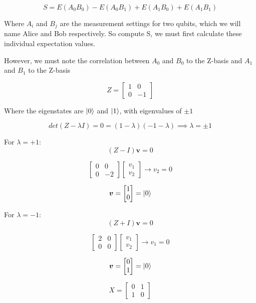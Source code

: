 \documentclass[12pt]{article}
\begin{document}
$$
S = E(A_0 B_0) - E(A_0 B_1) + E(A_1 B_0) + E(A_1 B_1)
$$

Where $A_i$ and $B_j$ are the measurement settings for two qubits, which we will name Alice and Bob respectively. So compute S, we must first calculate these individual expectation values.

However, we must note the correlation between $A_0$ and $B_0$ to the Z-basis and $A_1$ and $B_1$ to the Z-basis

$$
Z = \begin{bmatrix}
1 & 0 \\
0 & -1
\end{bmatrix}
$$

Where the eigenstates are $\ket{0}$ and $\ket{1}$, with eigenvalues of $\pm1$

$$
det(Z-\lambda I) = 0 = (1-\lambda)(-1-\lambda) \implies \lambda = \pm 1
$$

For $\lambda = +1$:
$$
(Z-I)\boldsymbol{v} = 0 
$$

$$
\begin{bmatrix}
0 & 0 \\
0 & -2
\end{bmatrix}
\begin{bmatrix}
v_1 \\
v_2
\end{bmatrix} \rightarrow v_2 = 0
$$

$$
\boldsymbol{v} = \begin{bmatrix}
1 \\
0
\end{bmatrix} = \ket{0}
$$

For $\lambda = -1$:
$$
(Z+I)\boldsymbol{v} = 0 
$$

$$
\begin{bmatrix}
2 & 0 \\
0 & 0
\end{bmatrix}
\begin{bmatrix}
v_1 \\
v_2
\end{bmatrix} \rightarrow v_1 = 0
$$

$$
\boldsymbol{v} = \begin{bmatrix}
0 \\
1
\end{bmatrix} = \ket{0}
$$



$$
X = \begin{bmatrix}
0 & 1 \\
1 & 0
\end{bmatrix}
$$
\end{document}
